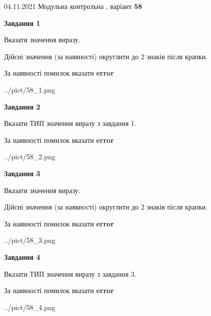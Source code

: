 \documentclass[11pt, ukrainian]{article}
\begin{document}
{04.11.2021 Модульна контрольна , варіант  \No \textbf { 58 }\par}
{
\begin {large}
{\begin {center}\textbf{Завдання 1}\end {center}}\par
Вказати значення виразу. \par
Дійсні значення (за наявності) округлити до 2 знаків після крапки. \par
За наявності помилок вказати \textbf{error}

\begin{center}
	{../pict/58_1.png}
\end{center}
\newpage

{\begin {center}\textbf{Завдання 2}\end {center}}\par
Вказати ТИП значення виразу з завдання 1. \par
За наявності помилок вказати \textbf{error}

\begin{center}
	{../pict/58_2.png}
\end{center}
\newpage

{\begin {center}\textbf{Завдання 3}\end {center}}\par
Вказати значення виразу. \par
Дійсні значення (за наявності) округлити до 2 знаків після крапки. \par
За наявності помилок вказати \textbf{error}

\begin{center}
	{../pict/58_3.png}
\end{center}
\newpage

{\begin {center}\textbf{Завдання 4}\end {center}}\par
Вказати ТИП значення виразу з завдання 3. \par
За наявності помилок вказати \textbf{error}

\begin{center}
	{../pict/58_4.png}
\end{center}
\newpage


\end{large}}
\end{document}
